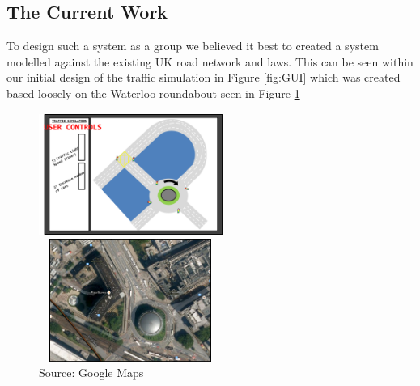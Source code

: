 \documentclass[a4paper,11pt]{article}
\begin{document}
\subsection{The Current Work}%
To design such a system as a group we believed it best to created a system modelled against the existing UK road network and laws. This can be seen within our initial design of the traffic simulation in Figure \ref{fig:GUI} which was created based loosely on the Waterloo roundabout seen in Figure \ref{fig:Waterloo}

\begin{figure}[ht]%
\centering
\begin{minipage}[b]{0.45\linewidth}
		\includegraphics[width=6cm,height=4cm]{UserControls.png} 
	\caption*{ }
	\label{fig:GUI}
\end{minipage}
\begin{minipage}[b]{0.45\linewidth}
	\includegraphics[width=6cm, height=4cm]{WATERLOO.png} 	
	\caption*{Source: Google Maps}
	\label{fig:Waterloo}
\end{minipage}

\end{figure}
\end{document}
